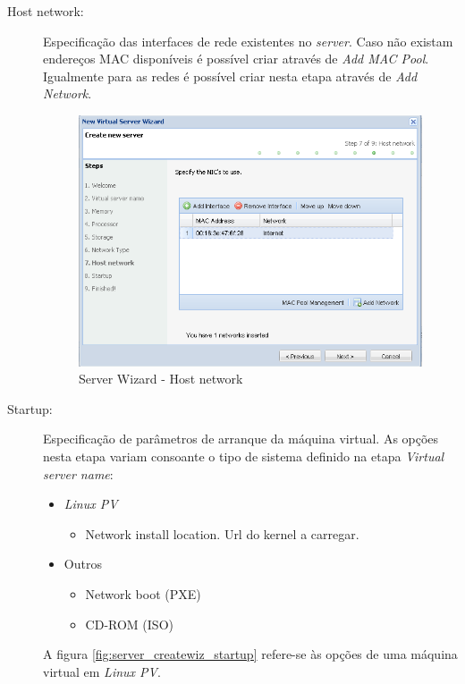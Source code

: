 \begin{description}
	\item[Host network:] Especificação das interfaces de rede existentes no \emph{server}. Caso não existam endereços MAC disponíveis é possível criar através de \emph{Add MAC Pool}. Igualmente para as redes é possível criar nesta etapa através de \emph{Add Network}.
		\begin{figure}[H]
        		\begin{center}
	        	\includegraphics[scale=0.5]{screenshots/server_createwiz_hostnet.png}
	        	\caption{Server Wizard - Host network}
		        \label{fig:server_createwiz_hostnet}
        		\end{center}
		\end{figure}

        \item[Startup:] Especificação de parâmetros de arranque da máquina virtual. As opções nesta etapa variam consoante o tipo de sistema definido na etapa \emph{Virtual server name}:
		\begin{itemize}
			\item \emph{Linux PV}
				\begin{itemize}
					\item Network install location. Url do kernel a carregar.
				\end{itemize}
			\item Outros
				\begin{itemize}
					\item Network boot (PXE)
					\item CD-ROM (ISO)
				\end{itemize}
		\end{itemize}
A figura \ref{fig:server_createwiz_startup} refere-se às opções de uma máquina virtual em \emph{Linux PV}.


\end{description}
